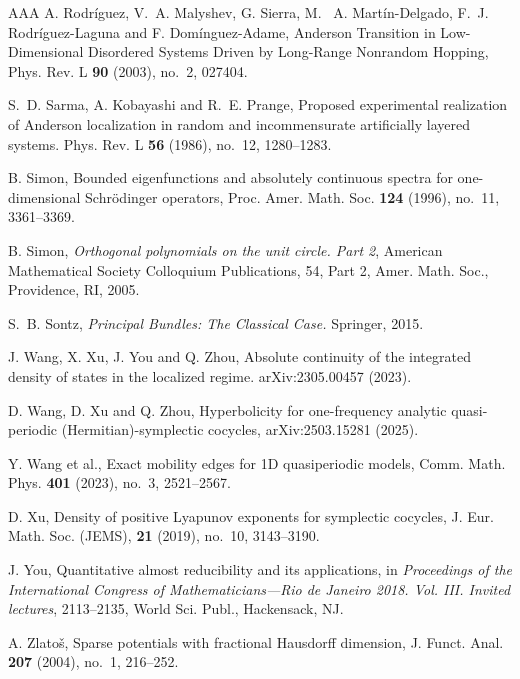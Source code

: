 \documentclass[11pt]{amsart}
\theoremstyle{remark}
\theoremstyle{definition}
\begin{document}
\begin{thebibliography}{AAA}
A. Rodr\'iguez, V.~A. Malyshev, G. Sierra, M. ~A. Mart\'in-Delgado, F.~J. Rodr\'iguez-Laguna and  F. Dom\'inguez-Adame,  Anderson Transition in Low-Dimensional Disordered Systems Driven by Long-Range Nonrandom Hopping, Phys. Rev. L {\bf 90} (2003), no.~2, 027404.

S.~D. Sarma, A. Kobayashi and R.~E. Prange, Proposed experimental realization of Anderson localization in random and incommensurate artificially layered systems. Phys. Rev. L {\bf 56} (1986), no.~12, 1280--1283.

B. Simon, Bounded eigenfunctions and absolutely continuous spectra for one-dimensional Schr\"odinger operators, Proc. Amer. Math. Soc. {\bf 124} (1996), no.~11, 3361--3369.

B. Simon, {\it Orthogonal polynomials on the unit circle. Part 2}, American Mathematical Society Colloquium Publications, 54, Part 2, Amer. Math. Soc., Providence, RI, 2005.

S.~B. Sontz, {\it Principal Bundles: The Classical Case.} Springer, 2015.

J. Wang, X. Xu, J. You and Q. Zhou, Absolute continuity of the integrated density of states in the localized regime.  arXiv:2305.00457 (2023).

D. Wang, D. Xu and Q. Zhou, 
Hyperbolicity for one-frequency analytic quasi-periodic (Hermitian)-symplectic cocycles, arXiv:2503.15281 (2025).

Y. Wang et al., Exact mobility edges for 1D quasiperiodic models, Comm. Math. Phys. {\bf 401} (2023), no.~3, 2521--2567.

D. Xu, Density of positive Lyapunov exponents for symplectic cocycles, J. Eur. Math. Soc. (JEMS), {\bf 21} (2019), no.~10, 3143--3190.

J. You, Quantitative almost reducibility and its applications, in {\it Proceedings of the International Congress of Mathematicians---Rio de Janeiro 2018. Vol. III. Invited lectures}, 2113--2135, World Sci. Publ., Hackensack, NJ.

A. Zlato\v s, Sparse potentials with fractional Hausdorff dimension, J. Funct. Anal. {\bf 207} (2004), no.~1, 216--252.



\end{thebibliography}
\end{document}
